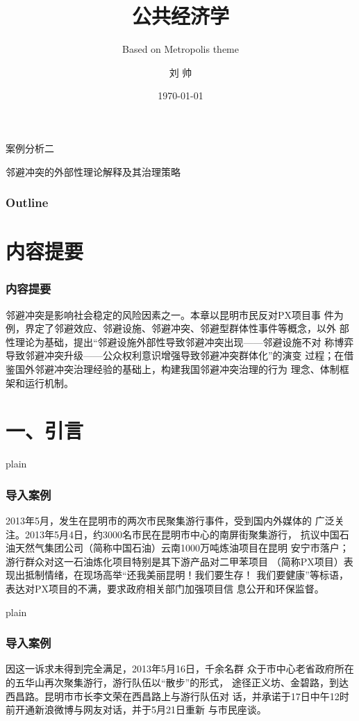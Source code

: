 \documentclass[aspectratio=169, 12pt]{beamer}
\title{公共经济学}
\subtitle{Based on Metropolis theme}
\author[LIU ShHUAI]{刘 {  } 帅}
\institute{山西师范大学 {  } 经济与管理学院}
\date{\today}
\begin{document}
\maketitle

\begin{frame}[standout]
    案例分析二\par
    \addtolength{\parskip}{.4em}
    邻避冲突的外部性理论解释及其治理策略
\end{frame}

\begin{frame}[plain]
    \frametitle{Outline}
    \tableofcontents[hideallsubsections]
  \end{frame}

\section{内容提要}

\begin{frame}[plain]
    \frametitle{内容提要}
    邻避冲突是影响社会稳定的风险因素之一。本章以昆明市民反对PX项目事
件为例，界定了邻避效应、邻避设施、邻避冲突、邻避型群体性事件等概念，以外
部性理论为基础，提出“邻避设施外部性导致邻避冲突出现——邻避设施不对
称博弈导致邻避冲突升级——公众权利意识增强导致邻避冲突群体化”的演变
过程；在借鉴国外邻避冲突治理经验的基础上，构建我国邻避冲突治理的行为
理念、体制框架和运行机制。
\end{frame}

\section{一、引言}

\begin{frame}{plain}
    \frametitle{导入案例}
    2013年5月，发生在昆明市的两次市民聚集游行事件，受到国内外媒体的
广泛关注。2013年5月4日，约3000名市民在昆明市中心的南屏街聚集游行，
抗议中国石油天然气集团公司（简称中国石油）云南1000万吨炼油项目在昆明
安宁市落户；游行群众对这一石油炼化项目特别是其下游产品对二甲苯项目
（简称PX项目）表现出抵制情绪，在现场高举“还我美丽昆明！我们要生存！
我们要健康”等标语，表达对PX项目的不满，要求政府相关部门加强项目信
息公开和环保监督。
\end{frame}

\begin{frame}{plain}
    \frametitle{导入案例}
    因这一诉求未得到完全满足，2013年5月16日，千余名群
众于市中心老省政府所在的五华山再次聚集游行，游行队伍以“散步”的形式，
途径正义坊、金碧路，到达西昌路。昆明市市长李文荣在西昌路上与游行队伍对
话，并承诺于17日中午12时前开通新浪微博与网友对话，并于5月21日重新
与市民座谈。
\end{frame}
\end{document}
